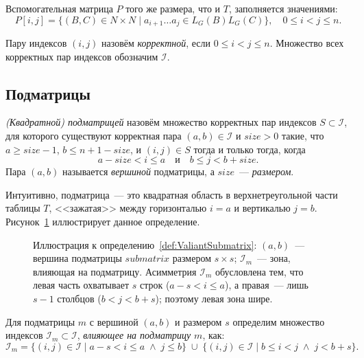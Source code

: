 \begin{definition}
  Вспомогательная матрица $P$ того же размера, что и $T$, заполняется значениями:
  \[
    P[i,j] = \{(B,C) \in N \times N \mid a_{i+1} \dots a_{j} \in L_G(B) L_G(C)\},\quad 0 \leqslant i < j \leqslant n.
  \]
\end{definition}

\begin{definition}
  Пару индексов $(i, j)$ назовём \emph{корректной}, если $0 \leqslant i < j \leqslant n$.
  Множество всех корректных пар индексов обозначим $\mathcal{I}$.
\end{definition}

\subsection{Подматрицы}

\begin{definition}[Подматрица]
  \label{def:ValiantSubmatrix}
  \emph{(Квадратной) подматрицей} назовём множество корректных пар индексов $S \subset \mathcal{I}$, для которого существуют корректная пара $(a, b) \in \mathcal{I}$ и $size > 0$ такие, что $a \geqslant size - 1$, $b \leqslant n + 1 - size$, и $(i,j) \in S$ тогда и только тогда, когда
  \[
    a - size < i \leqslant a \quad\text{и}\quad b \leqslant j < b + size.
  \]
  Пара $(a, b)$ называется \emph{вершиной} подматрицы, а $size$~--- \emph{размером}.
\end{definition}

Интуитивно, подматрица~--- это квадратная область в верхнетреугольной части таблицы $T$, <<зажатая>> между горизонталью $i = a$ и вертикалью $j = b$.
Рисунок~\ref{fig:ValiantSubmatrix} иллюстрирует данное определение.

\begin{figure}[h]
  \centering
  \resizebox{0.7\linewidth}{!}{}
  \caption{Иллюстрация к определению~\ref{def:ValiantSubmatrix}: $(a,b)$~--- вершина подматрицы $submatrix$ размером $s\times s$; $\mathcal{I}_m$~--- зона, влияющая на подматрицу. Асимметрия $\mathcal{I}_m$ обусловлена тем, что левая часть охватывает $s$ строк ($a-s<i\le a$), а правая~--- лишь $s-1$ столбцов ($b<j<b+s$); поэтому левая зона шире.}
  \label{fig:ValiantSubmatrix}
\end{figure}

\begin{definition}
  \label{def:ValiantInfluencing}
  Для подматрицы $m$ с вершиной $(a,b)$ и размером $s$ определим множество индексов $\mathcal{I}_m \subset \mathcal{I}$, \emph{влияющее на подматрицу $m$}, как:
  \[
    \mathcal{I}_m = \{(i, j) \in \mathcal{I} \mid a - s < i \leqslant a \;\land\; j \leqslant b\} \;\cup\;
                     \{(i, j) \in \mathcal{I} \mid b \leqslant i < j \;\land\; j < b + s\}.
  \]
\end{definition}

